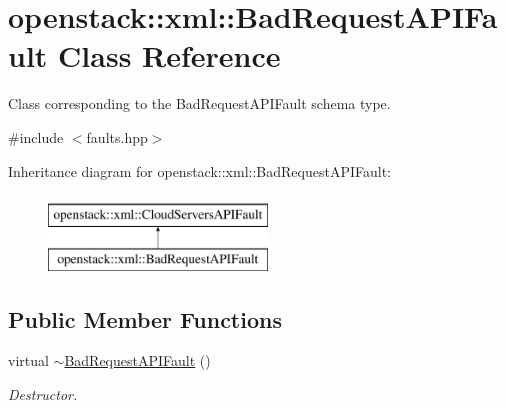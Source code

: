 \hypertarget{classopenstack_1_1xml_1_1BadRequestAPIFault}{
\section{openstack::xml::BadRequestAPIFault Class Reference}
\label{classopenstack_1_1xml_1_1BadRequestAPIFault}
}


Class corresponding to the BadRequestAPIFault schema type.  




{\ttfamily \#include $<$faults.hpp$>$}

Inheritance diagram for openstack::xml::BadRequestAPIFault:\begin{figure}[H]
\begin{center}
\leavevmode
\includegraphics[height=2.000000cm]{classopenstack_1_1xml_1_1BadRequestAPIFault}
\end{center}
\end{figure}
\subsection*{Public Member Functions}
\begin{DoxyCompactItemize}
\item 
\hypertarget{classopenstack_1_1xml_1_1BadRequestAPIFault_ac91a018b6c31562078f3456bdbbe155b}{
virtual \hyperlink{classopenstack_1_1xml_1_1BadRequestAPIFault_ac91a018b6c31562078f3456bdbbe155b}{$\sim$BadRequestAPIFault} ()}
\label{classopenstack_1_1xml_1_1BadRequestAPIFault_ac91a018b6c31562078f3456bdbbe155b}

\begin{DoxyCompactList}\small\item\em Destructor. \item\end{DoxyCompactList}\end{DoxyCompactItemize}
